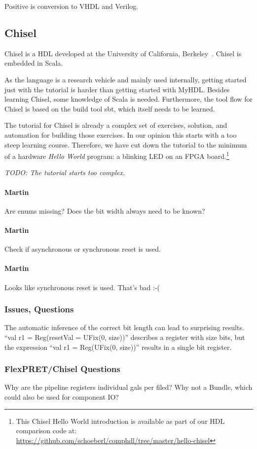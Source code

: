 \documentclass[10pt, technote, draftcls, onecolumn]{IEEEtran}
\newcommand{\todo}[1]{{\emph{TODO: #1}}}
\newcommand{\comment}[3]{\paragraph*{\textbf{#1}}{\color{#3}#2}}
\newcommand{\martin}[1]{\comment{Martin}{#1}{Blue}}
\begin{document}
Positive is conversion to VHDL and Verilog.

\subsection{Chisel}

Chisel is a HDL developed at the University of California, Berkeley~\cite{chisel:dac2012}.
Chisel is embedded in Scala.

As the language is a research vehicle and mainly used internally, getting
started just with the tutorial is harder than getting started with MyHDL.
Besides learning Chisel, some knowledge of Scala is needed. Furthermore,
the tool flow for Chisel is based on the build tool sbt, which itself needs to
be learned.

The tutorial for Chisel is already a complex set of exercises, solution, and
automation for building those exercises. In our opinion this starts with a
too steep learning course. Therefore, we have cut down the tutorial to
the minimum of a hardware \emph{Hello World} program: a blinking LED
on an FPGA board.\footnote{This Chisel Hello World introduction is
available as part of our HDL comparison code at:
\url{https://github.com/schoeberl/comphdl/tree/master/hello-chisel}}

\todo{The tutorial starts too complex.}

\martin{Are enums missing? Does the bit width always need to be known?}

\martin{Check if asynchronous or synchronous reset is used.}

\martin{Looks like synchronous reset is used. That's bad :-(}

\subsubsection{Issues, Questions}

The automatic inference of the correct bit length can lead to surprising
results. ``val r1 = Reg(resetVal = UFix(0, size))'' describes a register with
size bits, but the expression ``val r1 = Reg(UFix(0, size))'' results in a single
bit register.

\subsubsection{FlexPRET/Chisel Questions}

Why are the pipeline registers individual gals per filed? Why not a Bundle,
which could also be used for component IO?
\end{document}

